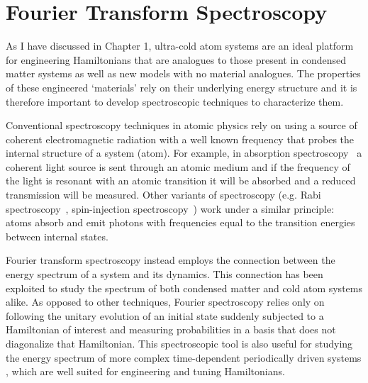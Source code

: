 

\renewcommand{\thechapter}{5}

\chapter{Fourier Transform Spectroscopy}
\label{ch:Fourier_spectroscopy}

As I have discussed in Chapter 1, ultra-cold atom systems are an ideal platform for engineering Hamiltonians that are analogues to those present in condensed matter systems as well as new models with no material analogues. The properties of these engineered `materials' rely on their underlying energy structure and it is therefore important to develop spectroscopic techniques to characterize them. 

Conventional spectroscopy techniques in atomic physics rely on using 
a source of coherent electromagnetic radiation with a well known frequency that probes the internal structure of a system (atom). For example, in absorption spectroscopy~\cite{demtroder_doppler-limited_2008} a coherent light source is sent through an atomic medium and if the frequency of the light is resonant with an atomic transition it will be absorbed and a reduced transmission will be measured. Other variants of spectroscopy (e.g. Rabi spectroscopy~\cite{rabi_space_1937}, spin-injection spectroscopy~\cite{cheuk_spin-injection_2012}) work under a similar principle: atoms absorb and emit photons with frequencies equal to the transition energies between internal states. 

Fourier transform spectroscopy instead employs the connection between the energy spectrum of a system and its dynamics. This connection has been exploited to study the spectrum of both condensed matter \cite{jonas_two-dimensional_2003} and cold atom systems \cite{yoshimura_diabatic-ramping_2014,wang_atom-interferometric_2015} alike.
As opposed to other techniques, Fourier spectroscopy relies only on following the unitary evolution of an initial state suddenly subjected to a Hamiltonian of interest and measuring probabilities in a basis that does not diagonalize that Hamiltonian. This spectroscopic tool is also useful for studying the energy spectrum of more complex time-dependent periodically driven systems \cite{jimenez-garcia_tunable_2015,eckardt_superfluid-insulator_2005,goldman_periodically_2014}, which are well suited for engineering and tuning Hamiltonians.


